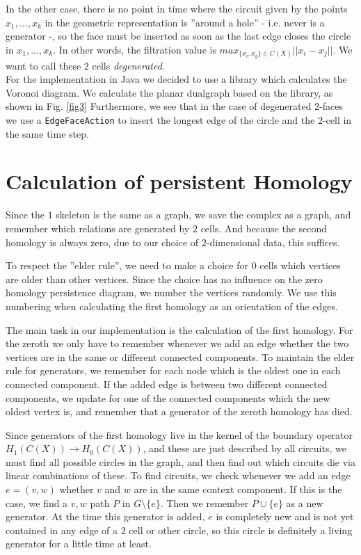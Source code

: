 \documentclass[11pt, a4paper,draft]{report}
\begin{document}
 	In the other case, there is no point in time where the circuit given by the points $x_1,\ldots,x_k$ in the geometric representation is ''around a hole'' - i.e. never is a generator -, so the face must be inserted as soon as the last edge closes the circle in $x_1,\ldots,x_k$. In other words, the filtration value is $max_{\{x_i,x_y\}\in C(X)}||x_i-x_j||$. We want to call these $2$ cells \textit{degenerated}.\\
For the implementation in Java we decided to use a library which calculates the Voronoi diagram. We calculate the planar dualgraph based on the library, as shown in Fig. \ref{fig3} Furthermore, we see that in the case of degenerated $2$-faces we use a \texttt{EdgeFaceAction} to insert the longest edge of the circle and the $2$-cell in the same time step.
 	
 	\section{Calculation of persistent Homology}
 	
Since the $1$ skeleton is the same as a graph, we save the complex as a graph, and remember which relations are generated by $2$ cells. And because the second homology is always zero, due to our choice of $2$-dimensional data, this suffices.

To respect the ''elder rule'', we need to make a choice for $0$ cells which vertices are older than other vertices. Since the choice has no influence on the zero homology persistence diagram, we number the vertices randomly. We use this numbering when calculating the first homology as an orientation of the edges.

The main task in our implementation is the calculation of the first homology. For the zeroth we only have to remember whenever we add an edge whether the two vertices are in the same or different connected components. To maintain the elder rule for generators, we remember for each node which is the oldest one in each connected component. If the added edge is between two different connected components, we update for one of the connected components which the new oldest vertex is, and remember that a generator of the zeroth homology has died.

Since generators of the first homology live in the kernel of the boundary operator $H_1(C(X))\rightarrow H_0(C(X))$, and these are just described by all circuits, we must find all possible circles in the graph, and then find out which circuits die via linear combinations of these.
To find circuits, we check whenever we add an edge $e=(v,w)$ whether $v$ and $w$ are in the same context component. If this is the case, we find a $v,w$ path $P$ in $G\setminus \{e\}$. Then we remember $P\cup \{e\}$ as a new generator. At the time this generator is added, $e$ is completely new and is not yet contained in any edge of a $2$ cell or other circle, so this circle is definitely a living generator for a little time at least. 
\end{document}
